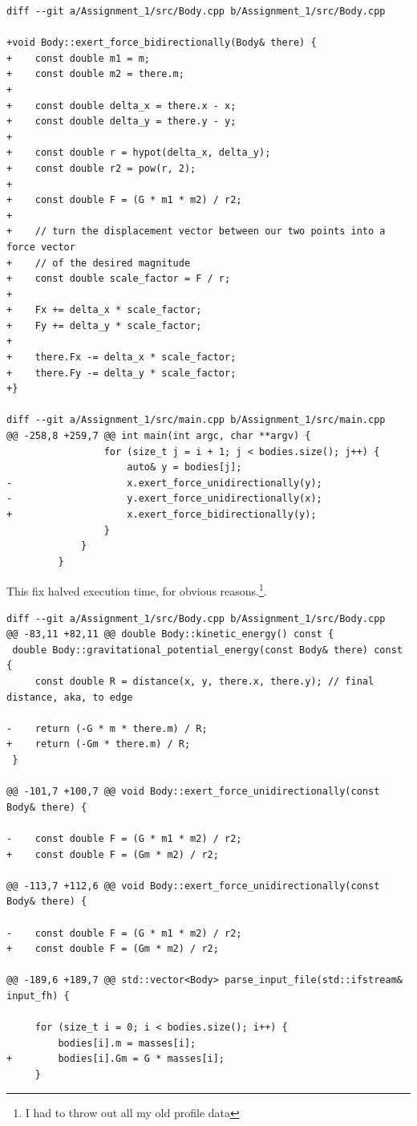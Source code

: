\documentclass[11pt,a4paper]{article}
\begin{document}
\begin{verbatim}
diff --git a/Assignment_1/src/Body.cpp b/Assignment_1/src/Body.cpp

+void Body::exert_force_bidirectionally(Body& there) {
+    const double m1 = m;
+    const double m2 = there.m;
+
+    const double delta_x = there.x - x;
+    const double delta_y = there.y - y;
+
+    const double r = hypot(delta_x, delta_y);
+    const double r2 = pow(r, 2);
+
+    const double F = (G * m1 * m2) / r2;
+
+    // turn the displacement vector between our two points into a force vector
+    // of the desired magnitude
+    const double scale_factor = F / r;
+
+    Fx += delta_x * scale_factor;
+    Fy += delta_y * scale_factor;
+
+    there.Fx -= delta_x * scale_factor;
+    there.Fy -= delta_y * scale_factor;
+}

diff --git a/Assignment_1/src/main.cpp b/Assignment_1/src/main.cpp
@@ -258,8 +259,7 @@ int main(int argc, char **argv) {
                 for (size_t j = i + 1; j < bodies.size(); j++) {
                     auto& y = bodies[j];
-                    x.exert_force_unidirectionally(y);
-                    y.exert_force_unidirectionally(x);
+                    x.exert_force_bidirectionally(y);
                 }
             }
         }
\end{verbatim}

This fix halved execution time, for obvious reasons.\footnote{I had to throw out all my old profile data}.

\begin{verbatim}
diff --git a/Assignment_1/src/Body.cpp b/Assignment_1/src/Body.cpp
@@ -83,11 +82,11 @@ double Body::kinetic_energy() const {
 double Body::gravitational_potential_energy(const Body& there) const {
     const double R = distance(x, y, there.x, there.y); // final distance, aka, to edge

-    return (-G * m * there.m) / R;
+    return (-Gm * there.m) / R;
 }

@@ -101,7 +100,7 @@ void Body::exert_force_unidirectionally(const Body& there) {

-    const double F = (G * m1 * m2) / r2;
+    const double F = (Gm * m2) / r2;

@@ -113,7 +112,6 @@ void Body::exert_force_unidirectionally(const Body& there) {

-    const double F = (G * m1 * m2) / r2;
+    const double F = (Gm * m2) / r2;

@@ -189,6 +189,7 @@ std::vector<Body> parse_input_file(std::ifstream& input_fh) {

     for (size_t i = 0; i < bodies.size(); i++) {
         bodies[i].m = masses[i];
+        bodies[i].Gm = G * masses[i];
     }

\end{verbatim}
\end{document}
